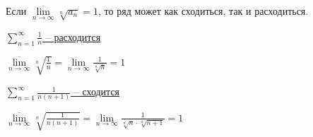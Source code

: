 \begin{remark}\slashns
	
	Если $ \overline{\lim\limits_{n \to \infty}} \sqrt[n]{a_n} = 1$, то ряд может как сходиться, так и расходиться.
\end{remark}

\begin{example}\slashns

	\underline{$\sum\limits_{n = 1}^{\infty} \frac1n$ -- расходится}

	$\overline{\lim\limits_{n \to \infty}} \sqrt[n]{\frac 1n} = \lim\limits_{n \to \infty} \frac 1 {\sqrt[n] {n}} = 1$

	\underline{$\sum\limits_{n = 1}^{\infty} \frac1{n(n+1)}$ -- сходится}
	
	$\overline{\lim\limits_{n \to \infty}} \sqrt[n]{\frac 1{n(n+1)}} = \lim\limits_{n \to \infty} \frac 1 {\sqrt[n] {n} \cdot \sqrt[n] {n + 1}} = 1$
\end{example}

